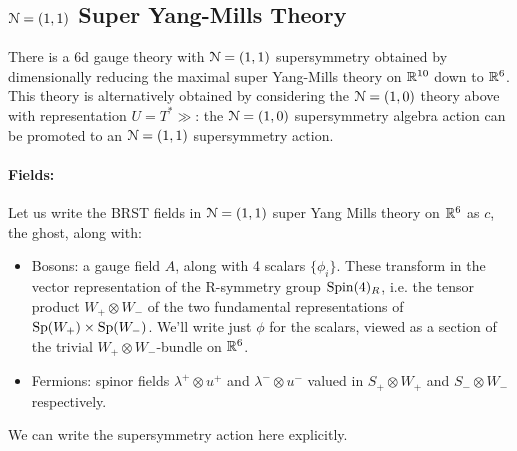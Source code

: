 \documentclass[10pt, oneside]{article}
\begin{document}
\subsection{\texorpdfstring{$\mathcal{N} = (1,1)$}{N=(1,1)} Super Yang-Mills Theory}

There is a 6d gauge theory with $\mathcal{N}=(1,1)$ supersymmetry obtained by dimensionally reducing the maximal super Yang-Mills theory on $\mathbb R^{10}$ down to $\mathbb R^6$. This theory is alternatively obtained by considering the $\mathcal{N}=(1,0)$ theory above with representation $U = T^*\gg$: the $\mathcal{N}=(1,0)$ supersymmetry algebra action can be promoted to an $\mathcal{N}=(1,1)$ supersymmetry action.  

\vspace{-10pt}
\paragraph{Fields:} Let us write the BRST fields in $\mathcal{N}=(1,1)$ super Yang Mills theory on $\mathbb R^6$ as $c$, the ghost, along with:
\begin{itemize}
 \item Bosons: a gauge field $A$, along with 4 scalars $\{\phi_i\}$.  These transform in the vector representation of the R-symmetry group $\mathrm{Spin}(4)_R$, i.e. the tensor product $W_+ \otimes W_-$ of the two fundamental representations of $\mathrm{Sp}(W_+) \times \mathrm{Sp}(W_-)$.  We'll write just $\phi$ for the scalars, viewed as a section of the trivial $W_+ \otimes W_-$-bundle on $\mathbb R^6$.
 \item Fermions: spinor fields $\lambda^+ \otimes u^+$ and $\lambda^- \otimes u^-$ valued in $S_+ \otimes W_+$ and $S_- \otimes W_-$ respectively.
\end{itemize}

We can write the supersymmetry action here explicitly. 
\end{document}
